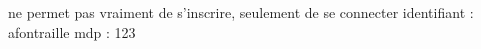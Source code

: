 
\begin{DoxyRefList}
\item[\label{bug__bug000001}%
\hypertarget{bug__bug000001}{}%
Fichier \hyperlink{connexion_8cpp}{connexion.cpp} ]ne permet pas vraiment de s'inscrire, seulement de se connecter identifiant \-: afontraille mdp \-: 123 
\end{DoxyRefList}